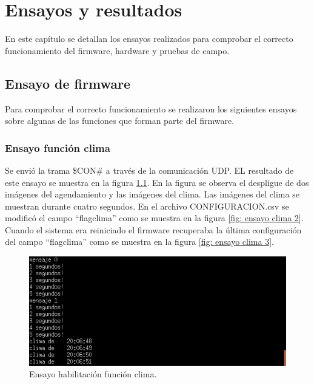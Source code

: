 
\chapter{Ensayos y resultados} %

\label{Chapter4} %


En este capítulo se detallan los ensayos realizados para comprobar el correcto funcionamiento del firmware, hardware y pruebas de campo.
\section{Ensayo de firmware}
Para comprobar el correcto funcionamiento se realizaron los siguientes ensayos sobre algunas de las funciones que forman parte del firmware.
\subsection{Ensayo función clima}
Se envió la trama \$CON\# a través de la comunicación UDP. EL resultado de este ensayo se muestra en la figura \ref{fig: ensayo clima 1}. En la figura se observa el despligue de dos imágenes del agendamiento y las imágenes del clima. Las imágenes del clima se muestran durante cuatro segundos. En el archivo CONFIGURACION.csv se modificó el campo ``flagclima'' como se muestra en la figura \ref{fig: ensayo clima 2}. Cuando el sistema era reiniciado el firmware recuperaba la última configuración del campo ``flagclima'' como se muestra en la figura \ref{fig: ensayo clima 3}. 

\begin{figure}[htpb]
	\centering
	\includegraphics[scale=0.8]{Figures/pruebaclima1.png} 
	\caption{Ensayo habilitación función clima.}
	\label{fig: ensayo clima 1}
\end{figure}

